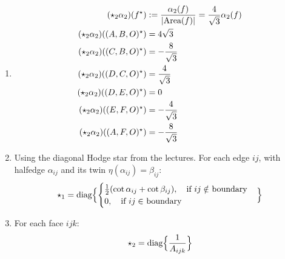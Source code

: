 \documentclass{article}
\def\nt{\notag}
\def\hal{\frac{1}{2}}
\begin{document}
\begin{enumerate}[label=(\alph*)]
    \item
    \begin{align}
        (\star_2\alpha_2)(f^\star) &:= \frac{\alpha_2(f)}{|\text{Area}( f )|} = \frac{4}{\sqrt3}\alpha_2(f)\nt\\
        (\star_2\alpha_2)((A,B,O)^\star) &= 4 \sqrt{3} \nt\\
        (\star_2\alpha_2)((C,B,O)^\star) &= -\frac{8}{\sqrt{3}} \nt\\
        (\star_2\alpha_2)((D,C,O)^\star) &= \frac{4}{\sqrt{3}} \nt\\
        (\star_2\alpha_2)((D,E,O)^\star) &= 0 \nt\\
        (\star_2\alpha_2)((E,F,O)^\star) &= -\frac{4}{\sqrt{3}} \nt\\
        (\star_2\alpha_2)((A,F,O)^\star) &= -\frac{8}{\sqrt{3}} \nt
    \end{align}

    \item
    Using the diagonal Hodge star from the lectures.
    For each edge $ij$, with halfedge $\alpha_{ij}$ and its twin $\eta(\alpha_{ij}) = \beta_{ij}$:
    $$
        \star_1 = \text{diag}\Bigl\{
            \begin{cases}
                \hal (\cot\alpha_{ij} + \cot\beta_{ij}), \quad \text{if $ij \notin$ boundary} \\
                0, \quad \text{if $ij \in$ boundary}
            \end{cases}
        \Bigr\}
    $$

    \item
    For each face $ijk$:
    $$
        \star_2 = \text{diag}\Bigl\{\frac{1}{A_{ijk}}\Bigr\}
    $$
\end{enumerate}
\end{document}
